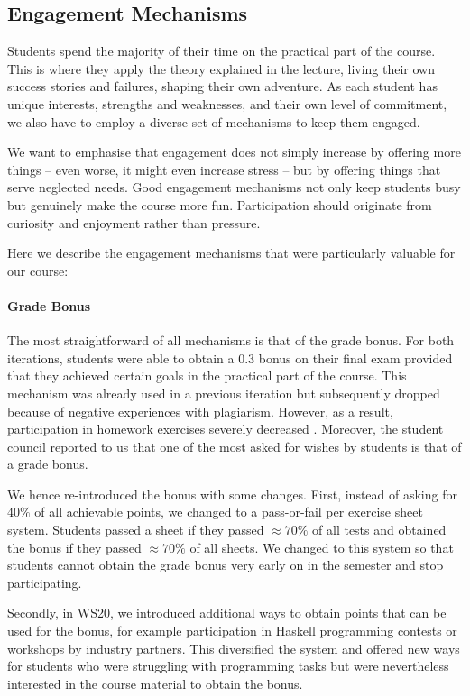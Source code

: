 \subsection{Engagement Mechanisms}

Students spend the majority of their time on the practical part of the course.
This is where they apply the theory explained in the lecture,
living their own success stories and failures,
shaping their own adventure.
As each student has unique interests, strengths and weaknesses, and their own level of commitment,
we also have to employ a diverse set of mechanisms to keep them engaged.

We want to emphasise that engagement does not simply
increase by offering more things -- even worse, it might even increase stress --
but by offering things that serve neglected needs.
Good engagement mechanisms not only keep students busy
but genuinely make the course more fun.
Participation should originate from curiosity and enjoyment rather than pressure.

Here we describe the engagement mechanisms that were particularly valuable for our course:

\paragraph{Grade Bonus}
The most straightforward of all mechanisms is
that of the grade bonus.
For both iterations,
students were able to obtain a 0.3 bonus on their final exam provided that they achieved certain goals in the practical part of the course.
This mechanism was already used in a previous iteration
but subsequently dropped because of negative experiences with plagiarism.
However, as a result, participation in homework exercises
severely decreased \citep{next_1100}.
Moreover, the student council reported to us that one of the most asked for
wishes by students is that of a grade bonus.

We hence re-introduced the bonus with some changes.
First, instead of asking for $40\%$ of all achievable points,
we changed to a pass-or-fail per exercise sheet system.
Students passed a sheet if they
passed $\approx 70\%$ of all tests
and obtained the bonus if they passed $\approx 70\%$ of all sheets.
We changed to this system so that students
cannot obtain the grade bonus very early on in the semester and stop participating.

Secondly, in WS20, we introduced additional ways to
obtain points that can be used for the bonus,
for example participation in Haskell programming contests or workshops by industry partners.
This diversified the system and offered new ways for students who were struggling
with programming tasks but were nevertheless interested in the course material
to obtain the bonus.

